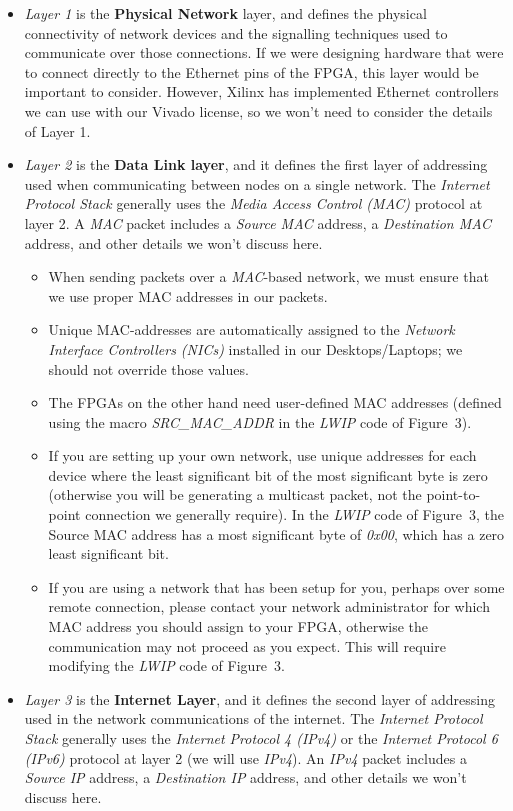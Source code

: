 \documentclass[11pt]{article}
\begin{document}
\begin{itemize}
    \item \textit{Layer 1} is the \textbf{Physical Network} layer, and defines the physical connectivity of network devices and the signalling techniques used to communicate over those connections. If we were designing hardware that were to connect directly to the Ethernet pins of the FPGA, this layer would be important to consider. However, Xilinx has implemented Ethernet controllers we can use with our Vivado license, so we won't need to consider the details of Layer 1.
    \item \textit{Layer 2} is the \textbf{Data Link layer}, and it defines the first layer of addressing used when communicating between nodes on a single network. The \textit{Internet Protocol Stack } generally uses the \textit{Media Access Control (MAC)} protocol at layer 2. A \textit{MAC} packet includes a \textit{Source MAC} address, a \textit{Destination MAC} address, and other details we won't discuss here. 
    \begin{itemize}
        \item When sending packets over a \textit{MAC}-based network, we must ensure that we use proper MAC addresses in our packets.
        \item Unique MAC-addresses are automatically assigned to the \textit{Network Interface Controllers (NICs)} installed in our Desktops/Laptops; we should not override those values.
        \item The FPGAs on the other hand need user-defined MAC addresses (defined using the macro \textit{SRC\_MAC\_ADDR} in the \textit{LWIP} code of Figure~3).
        \item If you are setting up your own network, use unique addresses for each device where the least significant bit of the most significant byte is zero (otherwise you will be generating a multicast packet, not the point-to-point connection we generally require). In the \textit{LWIP} code of Figure~3, the Source MAC address has a most significant byte of \textit{0x00}, which has a zero least significant bit.
        \item If you are using a network that has been setup for you, perhaps over some remote connection, please contact your network administrator for which MAC address you should assign to your FPGA, otherwise the communication may not proceed as you expect. This will require modifying the \textit{LWIP} code of Figure~3.
    \end{itemize}
    \item \textit{Layer 3} is the \textbf{Internet Layer}, and it defines the second layer of addressing used in the network communications of the internet. The \textit{Internet Protocol Stack } generally uses the \textit{Internet Protocol 4 (IPv4)}  or the \textit{Internet Protocol 6 (IPv6) }protocol at layer 2 (we will use \textit{IPv4}). An \textit{IPv4} packet includes a \textit{Source IP} address, a \textit{Destination IP} address, and other details we won't discuss here.

\end{itemize}
\end{document}
